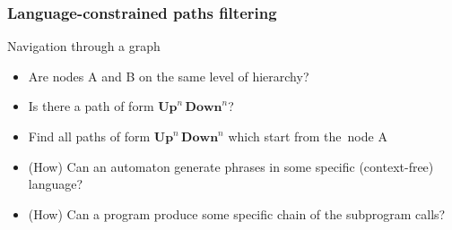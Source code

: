 \documentclass{beamer}
\begin{document}
\begin{frame}[fragile]
  \transwipe[direction=90]
  \frametitle{Language-constrained paths filtering}
  \begin{minipage}[m]{0.45\linewidth}
\end{minipage}\hfill
\begin{minipage}[m]{0.5\linewidth}
Navigation through a graph
\begin{itemize}
      \item Are nodes A and B on the same level of hierarchy?
      \item Is there a path of form $\textbf{Up}^n \, \textbf{Down}^n$?
      \item Find all paths of form $\textbf{Up}^n \, \textbf{Down}^n$ which start from the~node A
\end{itemize}

\end{minipage}

  \begin{itemize}
    \item (How) Can an automaton generate phrases in some specific (context-free) language?
    \item (How) Can a program produce some specific chain of the subprogram calls? 
  \end{itemize}
\end{frame}
\end{document}
